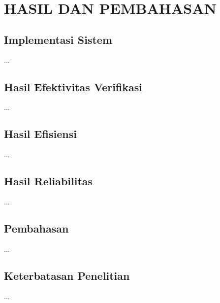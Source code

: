 \chapter{HASIL DAN PEMBAHASAN}
\label{bab:hasil}

\section{Implementasi Sistem}
...
\section{Hasil Efektivitas Verifikasi}
...
\section{Hasil Efisiensi}
...
\section{Hasil Reliabilitas}
...
\section{Pembahasan}
...
\section{Keterbatasan Penelitian}
...
